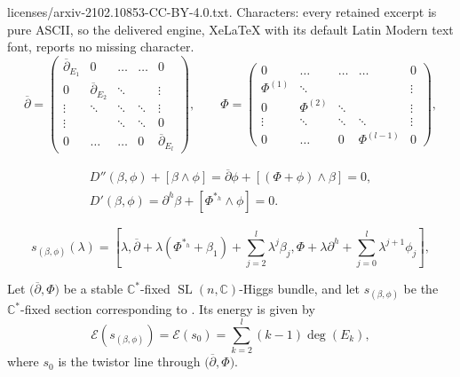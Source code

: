 \documentclass[10pt,a4paper]{amsart}
\newcommand\C{{\mathbb C}}
\begin{document}
licenses/arxiv-2102.10853-CC-BY-4.0.txt. Characters: every retained excerpt is pure ASCII, so the delivered engine, XeLaTeX with its default Latin Modern text font, reports no missing character.
\begin{equation}\label{Eq: VHSblockmatrices}
\overline{\partial} = \begin{pmatrix}
\overline{\partial}_{E_1} & 0 &\dots & \dots & 0\\
0 & \overline{\partial}_{E_2} & \ddots & & \vdots\\
\vdots & \ddots & \ddots & \ddots & \vdots\\
\vdots & & \ddots &\ddots & 0\\
0 & \dots & \dots & 0 & \overline{\partial}_{E_l}
\end{pmatrix},\qquad
\Phi = \begin{pmatrix}
0 & \dots & \dots & \dots & 0\\
\Phi^{(1)} & \ddots & & &\vdots\\
0 & \Phi^{(2)} & \ddots & &\vdots\\
\vdots & \ddots & \ddots & \ddots & \vdots\\
0 & \dots & 0 & \Phi^{(l-1)} & 0
\end{pmatrix},
\end{equation}

\begin{gather}
D''(\beta, \phi) + [\beta\wedge\phi] = {\overline{\partial}} \phi + [(\Phi+\phi)\wedge\beta]
 = 0,\nonumber \\
D'(\beta, \phi) = \partial^{h}\beta +[\Phi^{*_h}\wedge\phi] = 0.\label{eq:BB-slice2}
\end{gather}

\begin{equation}\label{eq:C*_sectionLiftC}
s_{(\beta,\phi)}(\lambda) = \left[\lambda, {\overline{\partial}} + \lambda(\Phi^{*_h}+\beta_1) + \sum_{j=2}^l\lambda^j\beta_j, \Phi + \lambda\partial^h + \sum_{j=0}^l\lambda^{j+1}\phi_j\right],
\end{equation}

\begin{Proposition}\label{Prop: energyC*-fixed_sections}
Let $\bigl({\overline{\partial}}, \Phi\bigr)$ be a stable $\C^*$-fixed $\operatorname{SL}(n,\C)$-Higgs bundle, and let $s_{(\beta,\phi)}$
be the $\C^*$-fixed section corresponding to .
Its energy is given by
\[
\mathcal{E}(s_{(\beta,\phi)}) = \mathcal{E}(s_0) = \sum_{k=2}^l(k-1)\deg(E_k),
\]
where $s_0$ is the twistor line through $\bigl({\overline{\partial}}, \Phi\bigr)$.
\end{Proposition}
\end{document}

